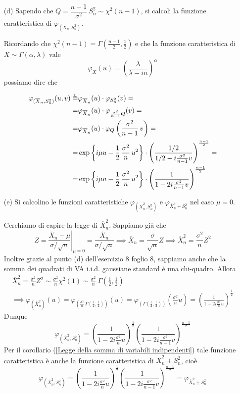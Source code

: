 \begin{enumerate}
\item [(d)] Sapendo che $Q=\dfrac{n-1}{\sigma^2}\ S_n^2\sim\chi^2(n-1)$, si calcoli la funzione caratteristica di $\varphi_{(\overline{X}_n,S_n^2)}$.

Ricordando che $\chi^2(n-1)=\Gamma\left(\frac{n-1}{2},\frac{1}{2} \right)$ e che la funzione caratteristica di $X\sim\Gamma(\alpha,\lambda)$ vale
$$
\varphi_X(u)=\left(\frac{\lambda}{\lambda-iu}\right)^\alpha
$$
possiamo dire che
\begin{gather*}
\begin{aligned}
\varphi_{(\overline{X}_n,S_n^2)}(u,v)\overset{\underset{\perp \!\!\! \perp}{}}{=}&\varphi_{\overline{X}_n}(u)\cdot\varphi_{S^2_n}(v)= \\
=&\varphi_{\overline{X}_n}(u)\cdot\varphi_{\frac{\sigma^2}{n-1}Q}(v)= \\
=&\varphi_{\overline{X}_n}(u)\cdot\varphi_{Q}\left(\frac{\sigma^2}{n-1}\,v\right)= \\
=&\exp\left\{i\mu u-\frac{1}{2}\,\frac{\sigma^2}{n}\, u^2\right\}\cdot\left(\frac{1/2}{1/2-i\frac{\sigma^2}{n-1}v}\right)^{\frac{n-1}{2}} =\\
=&\exp\left\{i\mu u-\frac{1}{2}\,\frac{\sigma^2}{n}\, u^2\right\}\cdot\left(\frac{1}{1-2i\frac{\sigma^2}{n-1}v}\right)^{\frac{n-1}{2}}
\end{aligned}
\end{gather*}

\item [(e)] Si calcolino le funzioni caratteristiche $\varphi_{\left(\overline{X}_n^2,S_n^2\right)}$ e $\varphi_{\overline{X}_n^2+S_n^2}$ nel caso $\mu=0$.

Cerchiamo di capire la legge di $\overline{X}_n^2$. Sappiamo già che
$$
Z=\left.\frac{\overline{X}_n-\mu}{\sigma/\sqrt{n}}\right|_{\mu=0}=\frac{\overline{X}_n}{\sigma/\sqrt{n}} \implies \overline{X}_n=\frac{\sigma}{\sqrt{n}}Z \implies \overline{X}_n^2= \frac{\sigma^2}{n}Z^2
$$ 
Inoltre grazie al punto (d) dell'esercizio 8 foglio 8, sappiamo anche che la somma dei quadrati di VA i.i.d. gaussiane standard è una chi-quadro. Allora
\begin{gather*}
\overline{X}_n^2= \frac{\sigma^2}{n}Z^2\sim\frac{\sigma^2}{n}\chi^2(1)\sim\frac{\sigma^2}{n}\ \Gamma\left(\frac{1}{2},\frac{1}{2}\right) \\
\implies \varphi_{\left(\overline{X}_n^2\right)}(u)=\varphi_{\left(\frac{\sigma^2}{n}\,\Gamma\left(\frac{1}{2},\frac{1}{2}\right)\right)}(u)=\varphi_{\left(\Gamma\left(\frac{1}{2},\frac{1}{2}\right)\right)}\left(\frac{\sigma^2}{n}u  \right)=\left(\frac{1}{1-2i\frac{\sigma^2}{n}u}\right)^{\frac{1}{2}}
\end{gather*}
Dunque
$$
\varphi_{\left(\overline{X}_n^2,S_n^2\right)}=\left(\frac{1}{1-2i\frac{\sigma^2}{n}u}\right)^{\frac{1}{2}} \left(\frac{1}{1-2i\frac{\sigma^2}{n-1}v}\right)^{\frac{n-1}{2}}
$$
Per il corollario (\ref{Legge della somma di variabili indipendenti}) tale funzione caratteristica è anche la funzione caratteristica di $\overline{X}_n^2+S_n^2$, cioè
$$
\varphi_{\left(\overline{X}_n^2,S_n^2\right)}=\left(\frac{1}{1-2i\frac{\sigma^2}{n}u}\right)^{\frac{1}{2}} \left(\frac{1}{1-2i\frac{\sigma^2}{n-1}v}\right)^{\frac{n-1}{2}}=\varphi_{\overline{X}_n^2+S_n^2}
$$


\end{enumerate}
